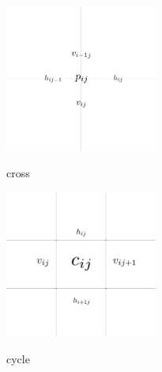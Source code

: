 \begin{clearpagefigure}
  \includegraphics[width=5cm]{fig/cross.png}
  \caption{cross}
  \label{fig:cross}
\end{clearpagefigure}

\begin{clearpagefigure}
  \includegraphics[width=5cm]{fig/cycle.png}
  \caption{cycle}
  \label{fig:cycle}
\end{clearpagefigure}
